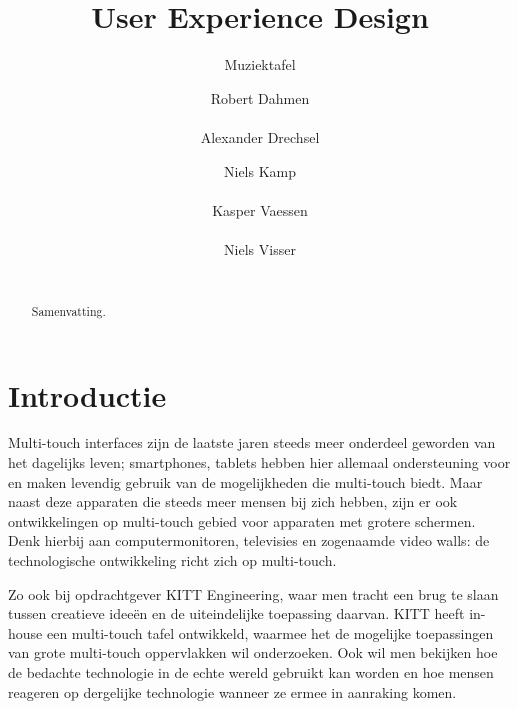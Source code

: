 \documentclass{acm}
\begin{document}
\title{User Experience Design}
\subtitle{Muziektafel}

\author{
\alignauthor Robert Dahmen\\
       \\
\alignauthor Alexander Drechsel
       \\
\and
\alignauthor Niels Kamp\\
       \\
\alignauthor Kasper Vaessen\\
       \\
\alignauthor Niels Visser\\
       \\
}
\maketitle

\begin{abstract}
Samenvatting.
\end{abstract}


\section{Introductie}
Multi-touch interfaces zijn de laatste jaren steeds meer onderdeel geworden van het dagelijks leven; smartphones, tablets hebben hier allemaal ondersteuning voor en maken levendig gebruik van de mogelijkheden die multi-touch biedt. Maar naast deze apparaten die steeds meer mensen bij zich hebben, zijn er ook ontwikkelingen op multi-touch gebied voor apparaten met grotere schermen. Denk hierbij aan computermonitoren, televisies en zogenaamde video walls: de technologische ontwikkeling richt zich op multi-touch.

Zo ook bij opdrachtgever KITT Engineering, waar men tracht een brug te slaan tussen creatieve idee\"en en de uiteindelijke toepassing daarvan. KITT heeft in-house een multi-touch tafel ontwikkeld, waarmee het de mogelijke toepassingen van grote multi-touch oppervlakken wil onderzoeken. Ook wil men bekijken hoe de bedachte technologie in de echte wereld gebruikt kan worden en hoe mensen reageren op dergelijke technologie wanneer ze ermee in aanraking komen.
\end{document}
